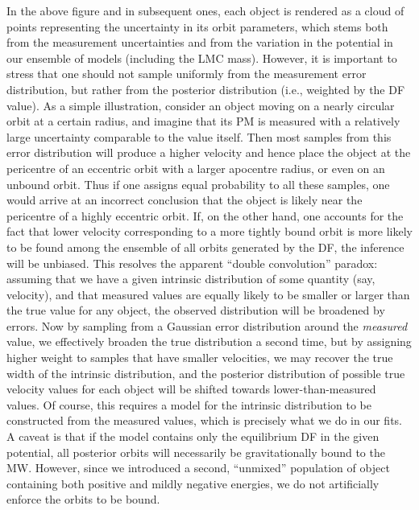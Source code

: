 \documentclass[usenatbib,fleqn]{mnras}
\begin{document}
In the above figure and in subsequent ones, each object is rendered as a cloud of points representing the uncertainty in its orbit parameters, which stems both from the measurement uncertainties and from the variation in the potential in our ensemble of models (including the LMC mass). However, it is important to stress that one should not sample uniformly from the measurement error distribution, but rather from the posterior distribution (i.e., weighted by the DF value). As a simple illustration, consider an object moving on a nearly circular orbit at a certain radius, and imagine that its PM is measured with a relatively large uncertainty comparable to the value itself. Then most samples from this error distribution will produce a higher velocity and hence place the object at the pericentre of an eccentric orbit with a larger apocentre radius, or even on an unbound orbit. Thus if one assigns equal probability to all these samples, one would arrive at an incorrect conclusion that the object is likely near the pericentre of a highly eccentric orbit. If, on the other hand, one accounts for the fact that lower velocity corresponding to a more tightly bound orbit is more likely to be found among the ensemble of all orbits generated by the DF, the inference will be unbiased. This resolves the apparent ``double convolution'' paradox: assuming that we have a given intrinsic distribution of some quantity (say, velocity), and that measured values are equally likely to be smaller or larger than the true value for any object, the observed distribution will be broadened by errors. Now by sampling from a Gaussian error distribution around the \textit{measured} value, we effectively broaden the true distribution a second time, but by assigning higher weight to samples that have smaller velocities, we may recover the true width of the intrinsic distribution, and the posterior distribution of possible true velocity values for each object will be shifted towards lower-than-measured values. Of course, this requires a model for the intrinsic distribution to be constructed from the measured values, which is precisely what we do in our fits. A caveat is that if the model contains only the equilibrium DF in the given potential, all posterior orbits will necessarily be gravitationally bound to the MW. However, since we introduced a second, ``unmixed'' population of object containing both positive and mildly negative energies, we do not artificially enforce the orbits to be bound.
\end{document}
